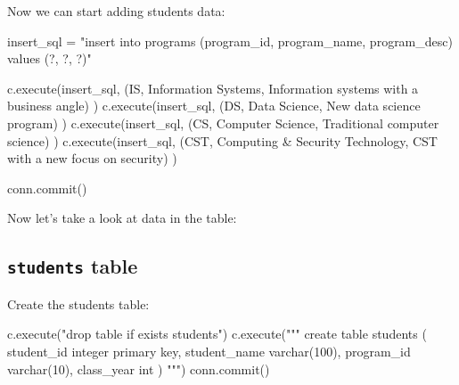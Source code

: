 \documentclass[
  letterpaper,
]{scrbook}
\newenvironment{Shaded}{\begin{snugshade}}{\end{snugshade}}
\newcommand{\NormalTok}[1]{\textcolor[rgb]{0.00,0.23,0.31}{#1}}
\newcommand{\OperatorTok}[1]{\textcolor[rgb]{0.37,0.37,0.37}{#1}}
\newcommand{\StringTok}[1]{\textcolor[rgb]{0.13,0.47,0.30}{#1}}
\begin{document}
Now we can start adding students data:

\begin{Shaded}
\begin{Highlighting}[]
\NormalTok{insert\_sql }\OperatorTok{=} \StringTok{"insert into programs (program\_id, program\_name, program\_desc) values (?, ?, ?)"}

\NormalTok{c.execute(insert\_sql, (}\StringTok{\textquotesingle{}IS\textquotesingle{}}\NormalTok{, }\StringTok{\textquotesingle{}Information Systems\textquotesingle{}}\NormalTok{, }\StringTok{\textquotesingle{}Information systems with a business angle\textquotesingle{}}\NormalTok{) )}
\NormalTok{c.execute(insert\_sql, (}\StringTok{\textquotesingle{}DS\textquotesingle{}}\NormalTok{, }\StringTok{\textquotesingle{}Data Science\textquotesingle{}}\NormalTok{, }\StringTok{\textquotesingle{}New data science program\textquotesingle{}}\NormalTok{) ) }
\NormalTok{c.execute(insert\_sql, (}\StringTok{\textquotesingle{}CS\textquotesingle{}}\NormalTok{, }\StringTok{\textquotesingle{}Computer Science\textquotesingle{}}\NormalTok{, }\StringTok{\textquotesingle{}Traditional computer science\textquotesingle{}}\NormalTok{) ) }
\NormalTok{c.execute(insert\_sql, (}\StringTok{\textquotesingle{}CST\textquotesingle{}}\NormalTok{, }\StringTok{\textquotesingle{}Computing \& Security Technology\textquotesingle{}}\NormalTok{, }\StringTok{\textquotesingle{}CST with a new focus on security\textquotesingle{}}\NormalTok{) )}

\NormalTok{conn.commit()}
\end{Highlighting}
\end{Shaded}

Now let's take a look at data in the table:

\subsection*{\texorpdfstring{\texttt{students}
table}{students table}}\label{students-table-1}

Create the students table:

\begin{Shaded}
\begin{Highlighting}[]
\NormalTok{c.execute(}\StringTok{"drop table if exists students"}\NormalTok{)}
\NormalTok{c.execute(}\StringTok{"""}
\StringTok{    create table students (}
\StringTok{        student\_id integer primary key, }
\StringTok{        student\_name varchar(100), }
\StringTok{        program\_id varchar(10),}
\StringTok{        class\_year int}
\StringTok{    )}
\StringTok{"""}\NormalTok{)}
\NormalTok{conn.commit()}
\end{Highlighting}
\end{Shaded}
\end{document}
